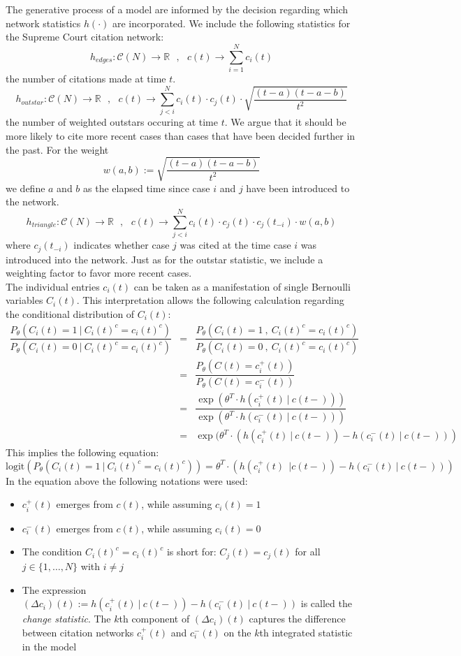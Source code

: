 \documentclass[headsepline=true, abstracton]{scrartcl}
\begin{document}
The generative process of a model are informed by
the decision regarding which network statistics $h(\cdot)$ are incorporated. We include the following statistics for the Supreme Court citation network:
$$h_{edges}:\mathcal{C}(N)\to \mathbb{R}~~~, ~~~c(t) \to \sum_{i=1}^Nc_i(t)$$
the number of citations made at time $t$. 
$$h_{outstar}:\mathcal{C}(N)\to \mathbb{R}~~~, ~~~c(t) \to \sum_{j<i}^Nc_i(t)\cdot c_j(t) \cdot \sqrt{\dfrac{(t-a)(t-a-b)}{t^2}}$$
the number of weighted outstars occuring at time $t$. We argue that it should be more likely to cite more recent cases than cases that have been decided further in the past. For the weight 
$$w(a,b):= \sqrt{\dfrac{(t-a)(t-a-b)}{t^2}}$$
we define $a$ and $b$ as the elapsed time since case $i$ and $j$ have been introduced to the network.
$$h_{triangle}:\mathcal{C}(N)\to \mathbb{R}~~~, ~~~c(t) \to \sum_{j<i}^Nc_i(t)\cdot c_j(t) \cdot
c_j(t_{-i}) \cdot w(a,b)$$
where $c_j(t_{-i})$ indicates whether case $j$ was cited at the time case $i$ was introduced into the network. Just as for the outstar statistic, we include a weighting factor to favor more recent cases. \\[0.3cm]


The individual entries $c_i(t)$ can be taken as a manifestation of single Bernoulli variables $C_i(t)$. This interpretation allows the following calculation regarding the conditional distribution of $C_i(t)$:
%
\begin{eqnarray*}
\dfrac{P_{\theta}(C_i(t)=1 ~|~ C_i(t)^c=c_i(t)^c)}{P_{\theta}(C_i(t)=0 ~|~ C_i(t)^c=c_i(t)^c)} &=&
\dfrac{P_{\theta}(C_i(t)=1 ~,~ C_i(t)^c=c_i(t)^c)}{P_{\theta}(C_i(t)=0 ~,~ C_i(t)^c=c_i(t)^c)} \\
                           &=&\dfrac{P_{\theta}(C(t)= c_i^+(t))}{P_{\theta}(C(t)=c_i^-(t))}\\
                           &=&\dfrac{\exp(\theta^T \cdot h(c_i^+(t)~|~c(t-)))}{\exp(\theta^T \cdot h(c_i^-(t)~|~c(t-)))}\\
                           &=& \exp(\theta^T \cdot (h(c_i^+(t)~|~c(t-)) - h(c_i^-(t)~|~c(t-)))
\end{eqnarray*}
%
This implies the following equation:
%
\begin{equation}
\text{logit}(P_{\theta}(C_i(t)=1 ~|~ C_i(t)^c=c_i(t)^c))= \theta^T \cdot (h(c_i^+(t)~~|c(t-)) - h(c_i^-(t)~|~c(t-)))
\label{Logit}
\end{equation}
In the equation above the following notations were used:
%
\begin{itemize}
\item $c_i^+(t)$ emerges from $c(t)$, while assuming $c_i(t)=1$
\item $c_i^-(t)$ emerges from $c(t)$, while assuming $c_i(t)=0$
\item The condition $C_i(t)^c=c_i(t)^c$ is short for: $C_j(t)=c_j(t)$ for all $j\in \{1,\dots,N\}$ with $i \neq j$
\item The expression $(\Delta c_i)(t):=h(c_i^+(t)~|~c(t-)) - h(c_i^-(t)~|~c(t-))$ is called the \textit{change statistic}. The $k$th component of $(\Delta c_i)(t)$ captures the difference between citation networks $c_i^+(t)$ and $c_i^-(t)$ on the $k$th integrated statistic in the model
\end{itemize}
\end{document}
